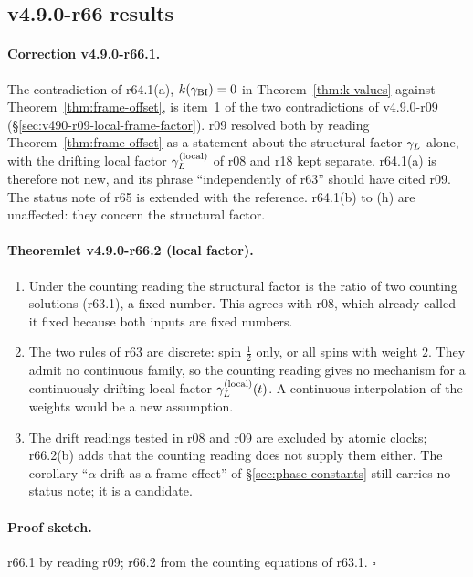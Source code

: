 \subsection*{v4.9.0-r66 results}
\label{subsec:v490-r66-results}

\paragraph{Correction v4.9.0-r66.1.}
The contradiction of r64.1(a), \(k(\gamma_{\mathrm{BI}})=0\) in Theorem~\ref{thm:k-values} against Theorem~\ref{thm:frame-offset}, is item~1 of the two contradictions of
v4.9.0-r09 (\S\ref{sec:v490-r09-local-frame-factor}).  r09 resolved both by reading Theorem~\ref{thm:frame-offset} as a statement about the structural factor
\(\gamma_L\) alone, with the drifting local factor \(\gamma_L^{(\mathrm{local})}\) of r08 and r18 kept separate.  r64.1(a) is therefore not new, and its phrase ``independently of
r63'' should have cited r09.  The status note of r65 is extended with the reference.  r64.1(b) to (h) are unaffected: they concern the structural factor.

\paragraph{Theoremlet v4.9.0-r66.2 (local factor).}
\begin{enumerate}[leftmargin=2em]
\item[(a)] Under the counting reading the structural factor is the ratio of two counting solutions (r63.1), a fixed number.  This agrees with r08, which already
called it fixed because both inputs are fixed numbers.
\item[(b)] The two rules of r63 are discrete: spin \(\tfrac12\) only, or all spins with weight \(2\).  They admit no continuous family, so the counting reading gives no
mechanism for a continuously drifting local factor \(\gamma_L^{(\mathrm{local})}(t)\).  A continuous interpolation of the weights would be a new assumption.
\item[(c)] The drift readings tested in r08 and r09 are excluded by atomic clocks; r66.2(b) adds that the counting reading does not supply them either.  The
corollary ``\(\alpha\)-drift as a frame effect'' of \S\ref{sec:phase-constants} still carries no status note; it is a candidate.
\end{enumerate}

\paragraph{Proof sketch.}
r66.1 by reading r09; r66.2 from the counting equations of r63.1.  \(\square\)

